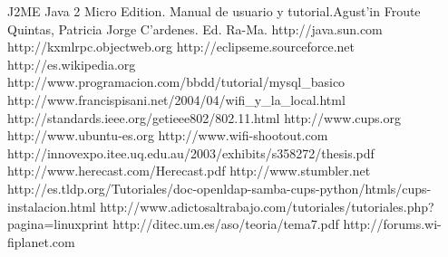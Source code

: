 \documentclass[a4paper,12pt]{article}
\begin{document}
\begin{thebibliography}{XXX}

	J2ME Java 2 Micro Edition. Manual de usuario y tutorial.Agust'in Froute Quintas, Patricia Jorge C'ardenes. Ed. Ra-Ma.
	http://java.sun.com
	http://kxmlrpc.objectweb.org
	  http://eclipseme.sourceforce.net
	 http://es.wikipedia.org
	http://www.programacion.com/bbdd/tutorial/mysql\_basico
http://www.francispisani.net/2004/04/wifi\_y\_la\_local.html
	http://standards.ieee.org/getieee802/802.11.html
	http://www.cups.org
	http://www.ubuntu-es.org
	http://www.wifi-shootout.com
	http://innovexpo.itee.uq.edu.au/2003/exhibits/s358272/thesis.pdf
	http://www.herecast.com/Herecast.pdf
	http://www.stumbler.net
http://es.tldp.org/Tutoriales/doc-openldap-samba-cups-python/htmls/cups-instalacion.html
http://www.adictosaltrabajo.com/tutoriales/tutoriales.php?pagina=linuxprint
	http://ditec.um.es/aso/teoria/tema7.pdf
	http://forums.wi-fiplanet.com
	
\end{thebibliography}
\end{document}
